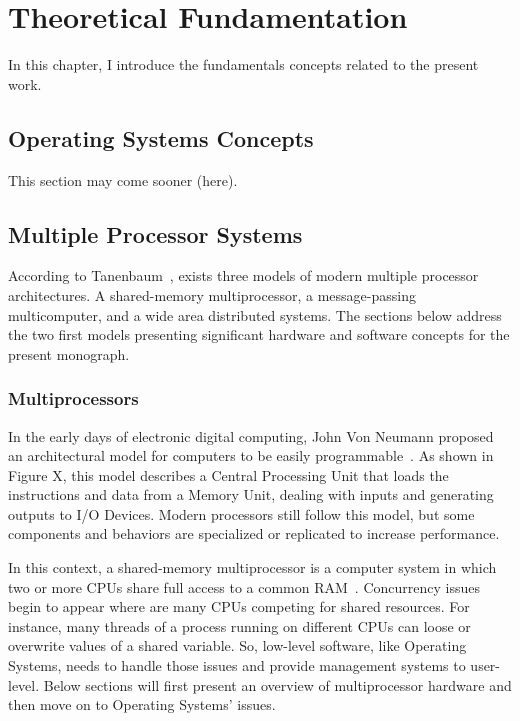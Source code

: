 \chapter{Theoretical Fundamentation} %
\label{ch.fundamentation}

	In this chapter, I introduce the fundamentals concepts related to the present work.

\section{Operating Systems Concepts}
	This section may come sooner (here).

\section{Multiple Processor Systems}
\label{sec.multiple_processor_systems}

	According to Tanenbaum~\cite{tanenbaum:4ed}, exists three models of
	modern multiple processor architectures.
	A shared-memory multiprocessor, a message-passing multicomputer, and a
	wide area distributed systems.
	The sections below address the two first models presenting significant
	hardware and software concepts for the present monograph.

	\subsection{Multiprocessors}

		In the early days of electronic digital computing, John Von Neumann proposed
		an architectural model for computers to be easily programmable~\cite{von-neumann:model}.
		As shown in Figure X, this model describes a Central Processing Unit that
		loads the instructions and data from a Memory Unit, dealing with inputs
		and generating outputs to I/O Devices.
		Modern processors still follow this model, but some components and behaviors
		are specialized or replicated to increase performance.
		
		In this context, a shared-memory multiprocessor is a computer system in which
		two or more CPUs share full access to a common RAM~\cite{tanenbaum:4ed}.
		Concurrency issues begin to appear where are many CPUs competing for shared resources.
		For instance, many threads of a process running on different CPUs can loose
		or overwrite values of a shared variable. So, low-level software, like
		Operating Systems, needs to handle those issues and provide management systems
		to user-level.
		Below sections will first present an overview of multiprocessor hardware and
		then move on to Operating Systems' issues.

